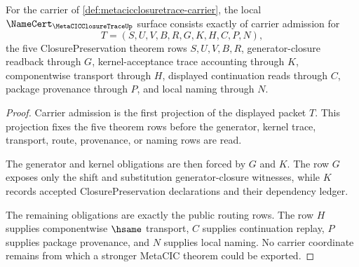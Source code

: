 \begin{theorem}
\label{thm:metacicclosuretrace-namecert-obligations}
For the carrier of \autoref{def:metacicclosuretrace-carrier}, the local $\NameCert_{\MetaCICClosureTraceUp}$ surface consists exactly of carrier admission for
$$
T=(S,U,V,B,R,G,K,H,C,P,N),
$$
the five ClosurePreservation theorem rows $S,U,V,B,R$, generator-closure readback through $G$, kernel-acceptance trace accounting through $K$, componentwise transport through $H$, displayed continuation reads through $C$, package provenance through $P$, and local naming through $N$.
\end{theorem}
\begin{proof}
Carrier admission is the first projection of the displayed packet $T$. This projection fixes the five theorem rows before the generator, kernel trace, transport, route, provenance, or naming rows are read.

The generator and kernel obligations are then forced by $G$ and $K$. The row $G$ exposes only the shift and substitution generator-closure witnesses, while $K$ records accepted ClosurePreservation declarations and their dependency ledger.

The remaining obligations are exactly the public routing rows. The row $H$ supplies componentwise $\hsame$ transport, $C$ supplies continuation replay, $P$ supplies package provenance, and $N$ supplies local naming. No carrier coordinate remains from which a stronger MetaCIC theorem could be exported.
\end{proof}

